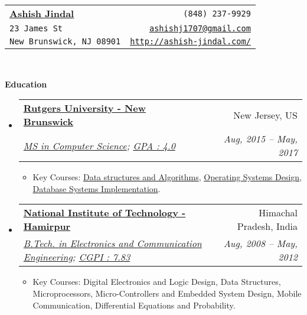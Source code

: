 \documentclass[letterpaper,11pt]{article}
\makeatletter
\newcommand{\resitem}[1]{\item #1 \vspace{-2.2pt}}
\newcommand{\resheading}[1]{{\large \colorbox{mygrey}{\begin{minipage}{\textwidth}{\textbf{#1 \vphantom{p\^{E}}}}\end{minipage}}}}
\newcommand{\ressubheading}[4]{
\begin{tabular*}{6.5in}{l@{\extracolsep{\fill}}r}
		\textbf{#1} & #2 \\
		\textit{#3} & \textit{#4} \\
\end{tabular*}\vspace{-6pt}}
\makeatother
\begin{document}
\newcommand{\mywebheader}{
\begin{tabular*}{7in}{l@{\extracolsep{\fill}}r}
	\textbf{\href{http://www.ashish-jindal.com/}{\LARGE Ashish Jindal}} & {\footnotesize \texttt{(848) 237-9929}}\\
	{\footnotesize \texttt{23 James St}} & {\footnotesize \texttt{\href{mailto:ashishj1707@gmail.com}{ashishj1707@gmail.com}}}\\
	 {\footnotesize \texttt{New Brunswick, NJ 08901}} & {\footnotesize \texttt{\href{http://www.ashish-jindal.com/}{http://ashish-jindal.com/}}} \\
	\end{tabular*}
\\
\vspace{0.1in}}

\mywebheader

\resheading{Education}
	\begin{itemize}
		\item
			\ressubheading{\href{http://www.rutgers.edu/}{Rutgers University - New Brunswick}}{New Jersey, US}{\href{https://www.cs.rutgers.edu/}{MS in Computer Science}; \href{http://www.ashish-jindal.com/rutgers_unofficial_transcript.pdf}{GPA : 4.0}}{Aug, 2015 -- May, 2017}
				{ \footnotesize
				\begin{itemize}
					\resitem{Key Courses: \href{https://www.cs.rutgers.edu/graduate/courses/512/}{Data structures and Algorithms}, \href{https://www.cs.rutgers.edu/graduate/courses/518/}{Operating Systems Design}, \href{https://www.cs.rutgers.edu/graduate/courses/539/}{Database Systems Implementation}.}
				\end{itemize}
				}
	\end{itemize}
	
	\begin{itemize}
		\item
			\ressubheading{\href{http://www.nith.ac.in/}{National Institute of Technology - Hamirpur}}{Himachal Pradesh, India}{\href{http://www.nith.ac.in/ece/}{B.Tech. in Electronics and Communication Engineering}; \href{http://www.ashish-jindal.com/nith_unofficial_transcript.pdf}{CGPI : 7.83}}{Aug, 2008 -- May, 2012}
				{ \footnotesize
				\begin{itemize}
					\resitem{Key Courses: Digital Electronics and Logic Design, Data Structures, Microprocessors, Micro-Controllers and Embedded System Design, Mobile Communication, Differential Equations and Probability.}
					
				\end{itemize}
				}
	\end{itemize} %
\end{document}
